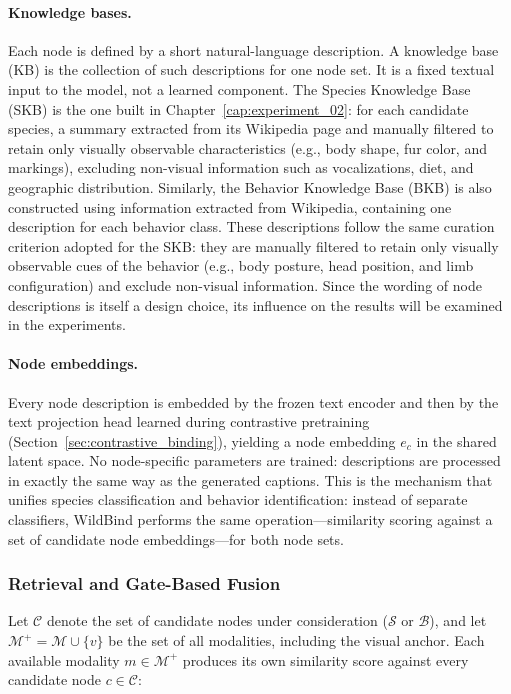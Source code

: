 \paragraph{Knowledge bases.} Each node is defined by a short natural-language description. A knowledge base (KB) is the collection of such descriptions for one node set. It is a fixed textual input to the model, not a learned component. The Species Knowledge Base (SKB) is the one built in Chapter~\ref{cap:experiment_02}: for each candidate species, a summary extracted from its Wikipedia page and manually filtered to retain only visually observable characteristics (e.g., body shape, fur color, and markings), excluding non-visual information such as vocalizations, diet, and geographic distribution. Similarly, the Behavior Knowledge Base (BKB) is also constructed using information extracted from Wikipedia, containing one description for each behavior class. These descriptions follow the same curation criterion adopted for the SKB: they are manually filtered to retain only visually observable cues of the behavior (e.g., body posture, head position, and limb configuration) and exclude non-visual information. Since the wording of node descriptions is itself a design choice, its influence on the results will be examined in the experiments.

\paragraph{Node embeddings.} Every node description is embedded by the frozen text encoder and then by the text projection head learned during contrastive pretraining (Section~\ref{sec:contrastive_binding}), yielding a node embedding $e_c$ in the shared latent space. No node-specific parameters are trained: descriptions are processed in exactly the same way as the generated captions. This is the mechanism that unifies species classification and behavior identification: instead of separate classifiers, WildBind performs the same operation---similarity scoring against a set of candidate node embeddings---for both node sets.

\subsubsection{Retrieval and Gate-Based Fusion}

Let $\mathcal{C}$ denote the set of candidate nodes under consideration ($\mathcal{S}$ or $\mathcal{B}$), and let $\mathcal{M}^{+}=\mathcal{M}\cup\{v\}$ be the set of all modalities, including the visual anchor. Each available modality $m\in\mathcal{M}^{+}$ produces its own similarity score against every candidate node $c\in\mathcal{C}$:

